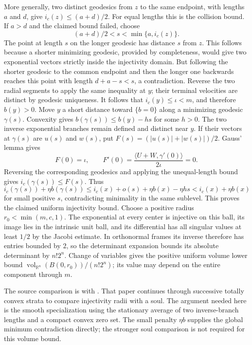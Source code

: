 More generally, two distinct geodesics from $z$ to the same endpoint,
with lengths $a$ and $d$, give
$i_c(z)\leq(a+d)/2$.  For equal lengths this is the collision
bound.  If $a>d$ and the claimed bound failed, choose
\[
       (a+d)/2<s<\min\{a,i_c(z)\}.
\]
The point at length $s$ on the longer geodesic has distance $s$
from $z$.  This follows because a shorter minimizing geodesic,
provided by completeness, would give two exponential vectors
strictly inside the injectivity domain.  But following the shorter
geodesic to the common endpoint and then the longer one backwards
reaches this point with length $d+a-s<s$, a contradiction.
Reverse the two radial segments to apply the same inequality at
$y$; their terminal velocities are distinct by geodesic uniqueness.
It follows that $i_c(y)\leq\iota<m$, and therefore $b(y)>0$.
Move $y$ a short distance toward $\{b=0\}$ along a minimizing geodesic
$\gamma(s)$.  Convexity gives $b(\gamma(s))\leq b(y)-hs$ for some
$h>0$.  The two inverse exponential branches remain defined and
distinct near $y$.  If their vectors at $\gamma(s)$ are $u(s)$
and $w(s)$, put $F(s)=(|u(s)|+|w(s)|)/2$.  Gauss' lemma gives
\[
 F(0)=\iota,\qquad
 F'(0)=\frac{\langle U+W,\gamma'(0)\rangle}{2\iota}=0.
\]
Reversing the corresponding geodesics and applying the unequal-length
bound gives $i_c(\gamma(s))\leq F(s)$.  Thus
\[
 i_c(\gamma(s))+\eta b(\gamma(s))
 \leq i_c(x)+o(s)+\eta b(x)-\eta hs
 <i_c(x)+\eta b(x)
\]
for small positive $s$, contradicting minimality in the same sublevel.
This proves the claimed uniform injectivity bound.  Choose a positive
radius $r_0<\min(m,c,1)$.  The exponential at every center is
injective on this ball, its image lies in the intrinsic unit ball,
and its differential has all singular values at least $1/2$ by the
Jacobi estimate.  In orthonormal frames its inverse therefore has
entries bounded by $2$, so the determinant expansion bounds its
absolute determinant by $n!2^n$.  Change of variables gives the
positive uniform volume lower bound
$\operatorname{vol}_{\mathbb R^n}(B(0,r_0))/(n!2^n)$; its value
may depend on the entire component through $m$.

The source comparison is with
\cite[Lemma 3.8, p.~15; Lemma 3.13, pp.~17--19;
Lemma 4.10 and Corollary 4.12, pp.~29--31;
Lemma 5.1, pp.~35--37]{MaederBaumdickerSeidel2025}.
That paper continues through successive totally convex strata to
compare injectivity radii with a soul.  The argument needed here is
the smooth specialization using the stationary average of two
inverse-branch lengths and a compact convex zero set.  The small
penalty $\eta b$ supplies the global minimum contradiction directly;
the stronger soul comparison is not required for this volume bound.

